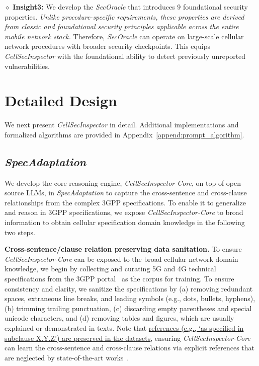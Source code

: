\documentclass[sigconf]{acmart}
\newcommand{\lm}{\textit{CellSecInspector}\xspace}
\newcommand{\core}{\textit{CellSecInspector-Core}\xspace}
\begin{document}
{\noindent $\diamond$ \textbf{Insight3:} We develop the \textit{SecOracle} that introduces 9 foundational security properties. 
\textit{Unlike procedure-specific requirements, these properties are derived from classic and foundational security principles applicable across the entire mobile network stack. }
Therefore, \textit{SecOracle} can operate on large-scale cellular network procedures with broader security checkpoints. This equips \lm with the foundational ability to detect previously unreported vulnerabilities.


\section{Detailed Design}
\label{sect:design}

We next present \lm in detail. Additional implementations and formalized algorithms are provided in Appendix~\ref{append:prompt_algorithm}.


\subsection{\textit{SpecAdaptation}}
We develop the core reasoning engine, \core, on top of open-source LLMs, in \textit{SpecAdaptation} to capture the cross-sentence and cross-clause relationships from the complex 3GPP specifications. To enable it to generalize and reason in 3GPP specifications, we expose \core to broad information to obtain cellular specification domain knowledge in the following two steps. 

\noindent \textbf{Cross-sentence/clause relation preserving data sanitation.} 
To ensure \core can be exposed to the broad cellular network domain knowledge, we begin by collecting and curating 5G and 4G technical specifications from the 3GPP portal~\cite{3GPP_Specs_2025} as the corpus for training. To ensure consistency and clarity, we sanitize the specifications by (a) removing redundant spaces, extraneous line breaks, and leading symbols (e.g., dots, bullets, hyphens), (b) trimming trailing punctuation, (c) discarding empty parentheses and special unicode characters, and (d) removing tables and figures, which are usually explained or demonstrated in texts. Note that \ul{references (e.g., `as specified
in subclause X.Y.Z') are preserved in the datasets}, ensuring \core can learn the cross-sentence and cross-clause relations via explicit references that are neglected by state-of-the-art works~\cite{rahman2024cellularlint}. 
 

}
\end{document}
